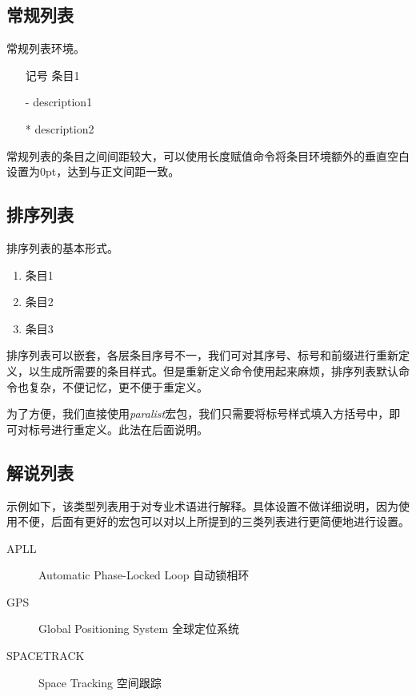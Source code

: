 \subsection{常规列表}
常规列表环境。

\begin{codeshow}
\begin{itemize}
    \item[记号] 条目1
    \item[-] description1
    \item[*] description2
\end{itemize}
\end{codeshow}

常规列表的条目之间间距较大，可以使用长度赋值命令将条目环境额外的垂直空白设置为0pt，达到与正文间距一致。

\begin{latex}
\itemsep=0pt
\parskip=0pt
\end{latex}

\subsection{排序列表}
排序列表的基本形式。

\begin{codeshow}
    \begin{enumerate}
        \item 条目1
        \item 条目2
        \item 条目3
    \end{enumerate}
\end{codeshow}

排序列表可以嵌套，各层条目序号不一，我们可对其序号、标号和前缀进行重新定义，以生成所需要的条目样式。但是重新定义命令使用起来麻烦，排序列表默认命令也复杂，不便记忆，更不便于重定义。

为了方便，我们直接使用\emph{paralist}宏包，我们只需要将标号样式填入方括号中，即可对标号进行重定义。此法在后面说明。

\subsection{解说列表}
示例如下，该类型列表用于对专业术语进行解释。具体设置不做详细说明，因为使用不便，后面有更好的宏包可以对以上所提到的三类列表进行更简便地进行设置。

\begin{codeshow}
    \begin{description}
        \item[APLL] 
        Automatic Phase-Locked Loop
        自动锁相环
        \item[GPS] Global 
        Positioning System 全球定位系统
        \item[SPACETRACK] 
        Space Tracking 空间跟踪
    \end{description}
\end{codeshow}

